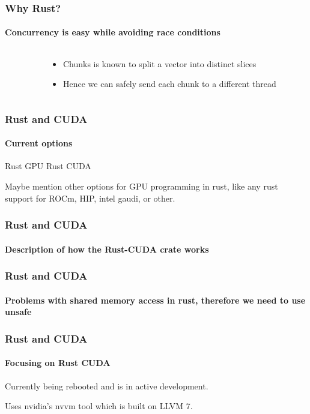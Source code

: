 \documentclass[aspectratio=169]{beamer}
\begin{document}
\begin{frame}
	\frametitle{Why Rust?}
	\framesubtitle{Concurrency is easy while avoiding race conditions}
	\begin{columns}
        \begin{column}{ 0.5\textwidth }
            
        \end{column}
		\begin{column}{ 0.4\textwidth }
            \begin{itemize}
                \item Chunks is known to split a vector into distinct slices
                \item Hence we can safely send each chunk to a different thread
            \end{itemize}
		\end{column}
	\end{columns}
\end{frame}

\begin{frame}
	\frametitle{Rust and CUDA}
	\framesubtitle{Current options}

	\begin{outline}[itemize]
		\1 Rust GPU
		\1 Rust CUDA
	\end{outline}

	Maybe mention other options for GPU programming in rust, like any rust support for ROCm, HIP, intel gaudi, or other.
\end{frame}

\begin{frame}
	\frametitle{Rust and CUDA}
	\framesubtitle{Description of how the Rust-CUDA crate works}
\end{frame}

\begin{frame}
	\frametitle{Rust and CUDA}
	\framesubtitle{Problems with shared memory access in rust, therefore we need to use unsafe}
\end{frame}

\begin{frame}
	\frametitle{Rust and CUDA}
	\framesubtitle{Focusing on Rust CUDA}

	Currently being rebooted and is in active development.

	Uses nvidia's nvvm tool which is built on LLVM 7.
\end{frame}
\end{document}
